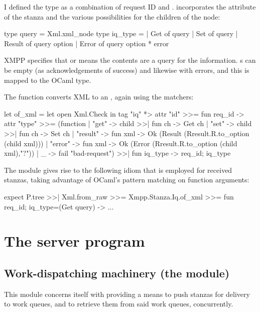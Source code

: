 I defined the type  as a combination of request ID and .  incorporates the  attribute of the  stanza and the various possibilities for the children of the node:

\begin{ocaml}
  type query = Xml.xml_node
  type iq_type =
  | Get of query
  | Set of query
  | Result of query option
  | Error of query option * error
\end{ocaml}

XMPP specifies that  or  means the contents are a query for the information.  s can be empty (as acknowledgements of success) and likewise with errors, and this is mapped to the OCaml  type.

The  function converts XML to an , again using the matchers:

\begin{ocaml}
let of_xml =
let open Xml.Check in
  tag "iq" *> attr "id" >>= fun req_id ->
    attr "type" >>= (function
    | "get" -> child >>| fun ch -> Get ch
    | "set" -> child >>| fun ch -> Set ch
    | "result" -> fun xml -> Ok (Result (Rresult.R.to_option (child xml)))
    | "error" -> fun xml -> Ok (Error (Rresult.R.to_option (child xml),"?"))
    | _ -> fail "bad-request") >>| fun iq_type -> { req_id; iq_type }
\end{ocaml}

The module gives rise to the following idiom that is employed for received  stanzas, taking advantage of OCaml's pattern matching on function arguments:

\begin{ocaml}
  expect P.tree >>| Xml.from_raw >>= Xmpp.Stanza.Iq.of_xml >>=
  fun { req_id; iq_type=(Get query) } -> ...
\end{ocaml}

\section{The server program}
\subsection{Work-dispatching machinery (the  module)}\label{sec:mod-dispatch}
This module concerns itself with providing a means to push stanzas for delivery to work queues, and to retrieve them from said work queues, concurrently.

